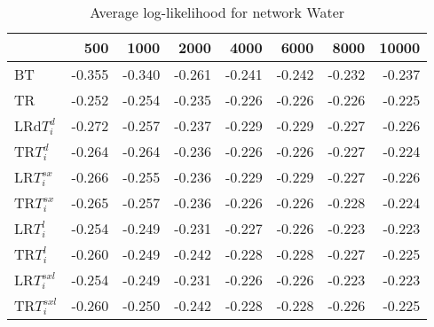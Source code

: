 \begin{table}
 \begin{center}
 \begin{tabular}{lrrrrrrr}
& 500 &  1000 & 2000 & 4000 & 6000& 8000&  10000\\\hline
BT & -0.355 & -0.340 & -0.261 & -0.241 & -0.242 & -0.232 & -0.237\\\hline
TR & -0.252 & -0.254 & -0.235 & -0.226 & -0.226 & -0.226 & -0.225\\\hline
LRd$T_i^d$ & -0.272 & -0.257 & -0.237 & -0.229 & -0.229 & -0.227 & -0.226\\\hline
TR$T_i^d$ & -0.264 & -0.264 & -0.236 & -0.226 & -0.226 & -0.227 & -0.224\\\hline
LR$T_i^{sx}$ & -0.266 & -0.255 & -0.236 & -0.229 & -0.229 & -0.227 & -0.226\\\hline
TR$T_i^{sx}$ & -0.265 & -0.257 & -0.236 & -0.226 & -0.226 & -0.228 & -0.224\\\hline
LR$T_i^l$ & -0.254 & -0.249 & -0.231 & -0.227 & -0.226 & -0.223 & -0.223\\\hline
TR$T_i^l$ & -0.260 & -0.249 & -0.242 & -0.228 & -0.228 & -0.227 & -0.225\\\hline
LR$T_i^{sxl}$ & -0.254 & -0.249 & -0.231 & -0.226 & -0.226 & -0.223 & -0.223\\\hline
TR$T_i^{sxl}$ & -0.260 & -0.250 & -0.242 & -0.228 & -0.228 & -0.226 & -0.225\\\hline
\end{tabular}
\end{center}
\caption{Average log-likelihood for network Water }
\label{Waterll}
\end{table}


